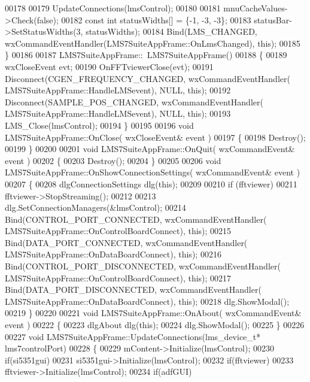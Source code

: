 \begin{DoxyCode}
{{{00178 
00179     UpdateConnections(lmsControl);
00180 
00181     mnuCacheValues->Check(\textcolor{keyword}{false});
00182     \textcolor{keyword}{const} \textcolor{keywordtype}{int} statusWidths[] = \{-1, -3, -3\};
00183     statusBar->SetStatusWidths(3, statusWidths);
00184     Bind(LMS\_CHANGED, wxCommandEventHandler(LMS7SuiteAppFrame::OnLmsChanged), \textcolor{keyword}{this});
00185 \}
00186 
00187 LMS7SuiteAppFrame::~LMS7SuiteAppFrame()
00188 \{
00189     wxCloseEvent evt;
00190     OnFFTviewerClose(evt);
00191     Disconnect(CGEN\_FREQUENCY\_CHANGED, wxCommandEventHandler(
      LMS7SuiteAppFrame::HandleLMSevent), NULL, \textcolor{keyword}{this});
00192     Disconnect(SAMPLE\_POS\_CHANGED, wxCommandEventHandler(
      LMS7SuiteAppFrame::HandleLMSevent), NULL, \textcolor{keyword}{this});
00193     LMS_Close(lmsControl);
00194 \}
00195 
00196 \textcolor{keywordtype}{void} LMS7SuiteAppFrame::OnClose( wxCloseEvent& event )
00197 \{
00198     Destroy();
00199 \}
00200 
00201 \textcolor{keywordtype}{void} LMS7SuiteAppFrame::OnQuit( wxCommandEvent& event )
00202 \{
00203     Destroy();
00204 \}
00205 
00206 \textcolor{keywordtype}{void} LMS7SuiteAppFrame::OnShowConnectionSettings( wxCommandEvent& event )
00207 \{
00208     dlgConnectionSettings dlg(\textcolor{keyword}{this});
00209 
00210     \textcolor{keywordflow}{if} (fftviewer)
00211         fftviewer->StopStreaming();
00212 
00213     dlg.SetConnectionManagers(&lmsControl);
00214     Bind(CONTROL\_PORT\_CONNECTED, wxCommandEventHandler(
      LMS7SuiteAppFrame::OnControlBoardConnect), \textcolor{keyword}{this});
00215     Bind(DATA\_PORT\_CONNECTED, wxCommandEventHandler(
      LMS7SuiteAppFrame::OnDataBoardConnect), \textcolor{keyword}{this});
00216     Bind(CONTROL\_PORT\_DISCONNECTED, wxCommandEventHandler(
      LMS7SuiteAppFrame::OnControlBoardConnect), \textcolor{keyword}{this});
00217     Bind(DATA\_PORT\_DISCONNECTED, wxCommandEventHandler(
      LMS7SuiteAppFrame::OnDataBoardConnect), \textcolor{keyword}{this});
00218     dlg.ShowModal();
00219 \}
00220 
00221 \textcolor{keywordtype}{void} LMS7SuiteAppFrame::OnAbout( wxCommandEvent& event )
00222 \{
00223     dlgAbout dlg(\textcolor{keyword}{this});
00224     dlg.ShowModal();
00225 \}
00226 
00227 \textcolor{keywordtype}{void} LMS7SuiteAppFrame::UpdateConnections(lms_device_t* lms7controlPort)
00228 \{
00229     mContent->Initialize(lmsControl);
00230     \textcolor{keywordflow}{if}(si5351gui)
00231         si5351gui->Initialize(lmsControl);
00232     \textcolor{keywordflow}{if}(fftviewer)
00233         fftviewer->Initialize(lmsControl);
00234     \textcolor{keywordflow}{if}(adfGUI)
}}}
\end{DoxyCode}
